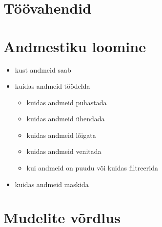 \section{Töövahendid}
\section{Andmestiku loomine}
\begin{itemize}
    \item kust andmeid saab

    \item kuidas andmeid töödelda
    \begin{itemize}
        \item kuidas andmeid puhastada
        \item kuidas andmeid ühendada
        \item kuidas andmeid lõigata
        \item kuidas andmeid venitada
        \item kui andmeid on puudu või kuidas filtreerida
    \end{itemize}

    
\item kuidas andmeid maskida

\end{itemize}

\section{Mudelite võrdlus}
